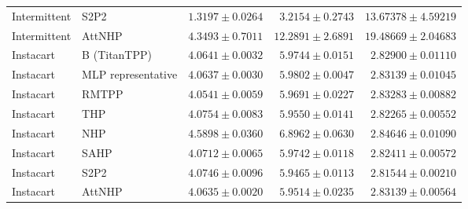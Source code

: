 \begin{table}[p]
{\begin{tabular}{llrrr}
Intermittent & S2P2 & $1.3197 \pm 0.0264$ & $3.2154 \pm 0.2743$ & $13.67378 \pm 4.59219$ \\
Intermittent & AttNHP & $4.3493 \pm 0.7011$ & $12.2891 \pm 2.6891$ & $19.48669 \pm 2.04683$ \\
Instacart & B (TitanTPP) & $4.0641 \pm 0.0032$ & $5.9744 \pm 0.0151$ & $2.82900 \pm 0.01110$ \\
Instacart & MLP representative & $4.0637 \pm 0.0030$ & $5.9802 \pm 0.0047$ & $2.83139 \pm 0.01045$ \\
Instacart & RMTPP & $4.0541 \pm 0.0059$ & $5.9691 \pm 0.0227$ & $2.83283 \pm 0.00882$ \\
Instacart & THP & $4.0754 \pm 0.0083$ & $5.9550 \pm 0.0141$ & $2.82265 \pm 0.00552$ \\
Instacart & NHP & $4.5898 \pm 0.0360$ & $6.8962 \pm 0.0630$ & $2.84646 \pm 0.01090$ \\
Instacart & SAHP & $4.0712 \pm 0.0065$ & $5.9742 \pm 0.0118$ & $2.82411 \pm 0.00572$ \\
Instacart & S2P2 & $4.0746 \pm 0.0096$ & $5.9465 \pm 0.0113$ & $2.81544 \pm 0.00210$ \\
Instacart & AttNHP & $4.0635 \pm 0.0020$ & $5.9514 \pm 0.0235$ & $2.83139 \pm 0.00564$ \\
\bottomrule
\end{tabular}}
\end{table}
